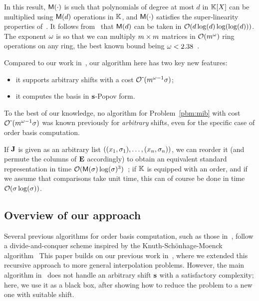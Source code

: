\documentclass[preprint]{sig-alternate-05-2015}
\begin{document}
In this result, $\mathsf{M}(\cdot)$ is such that polynomials of degree at most
$d$ in $\mathbb{K}[X]$ can be multiplied using $\mathsf{M}(d)$ operations in
$\mathbb{K}$, and $\mathsf{M}(\cdot)$ satisfies the super-linearity properties
of~\cite[Chapter~8]{vzGathen13}. It follows from~\cite{CanKal91} that
$\mathsf{M}(d)$ can be taken in $\mathcal{O}(d \log(d) \log(\log(d)))$. The exponent
$\omega$ is so that we can multiply $m \times m$ matrices in
$\mathcal{O}(m^\omega)$ ring operations on any ring, the best known bound
being $\omega < 2.38$~\cite{CopWin90, LeGall14}.

Compared to our work in~\cite{JeNeScVi15}, our algorithm here has two key new
features:
\begin{itemize}
  \setlength\itemsep{0cm}
  \item it supports arbitrary shifts with a cost $\mathcal{O}\tilde{~}(m^{\omega-1}
  \sigma)$;
  \item it computes the basis in $\mathbf{s}$-Popov form.
\end{itemize}
To the best of our knowledge, no algorithm for Problem~\ref{pbm:mib} with cost
$\mathcal{O}\tilde{~}(m^{\omega-1} \sigma)$ was known previously for \emph{arbitrary}
shifts, even for the specific case of order basis computation.

If $\mulmat$ is given as an arbitrary list $( (x_1,\sigma_1), \ldots,
(x_n,\sigma_n) )$, we can reorder it (and permute the columns of
$\evMat$ accordingly) to obtain an equivalent standard representation in time
$\mathcal{O}(\mathsf{M}(\sigma) \log(\sigma)^3)$~\cite[Proposition~12]{BoJeSc08}; if
$\mathbb{K}$ is equipped with an order, and if we assume that comparisons take unit
time, this can of course be done in time $\mathcal{O}(\sigma \log(\sigma))$.

\subsection{Overview of our approach}
\label{subsec:overview} 

Several previous algorithms for order basis computation, such as those
in~\cite{BecLab94,GiJeVi03}, follow a divide-and-conquer scheme inspired by the
Knuth-Sch\"onhage-Moenck algorithm~\cite{Knu70,Sch71,Moe73}
This paper builds on our previous work in~\cite{JeNeScVi15}, where we extended
this recursive approach to more general interpolation problems.  However, the
main algorithm in~\cite{JeNeScVi15} does not handle an arbitrary shift
$\mathbf{s}$ with a satisfactory complexity; here, we use it as a black box, after
showing how to reduce the  problem to a new one with suitable shift. 
\end{document}
